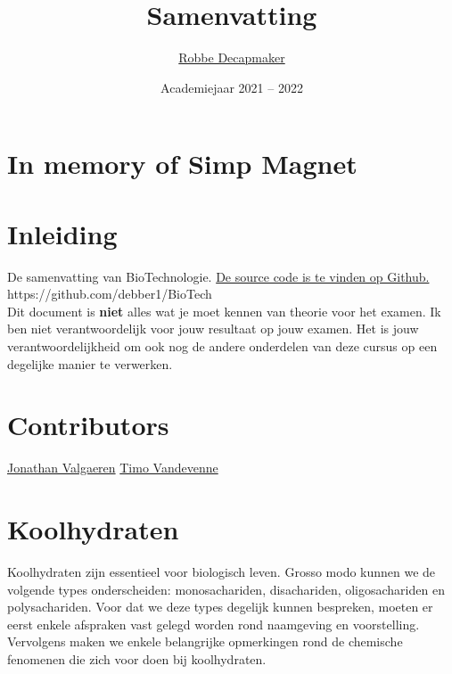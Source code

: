 \documentclass[a4paper,kul]{kulakarticle} %
\date{Academiejaar 2021 -- 2022}
\title{Samenvatting}
\author{\href{https://github.com/debber1}{Robbe Decapmaker}}
\begin{document}
\maketitle
\section*{In memory of Simp Magnet}
\section*{Inleiding}

De samenvatting van BioTechnologie. \href{https://github.com/debber1/BioTech}{De source code is te vinden op Github.}\\
https://github.com/debber1/BioTech\\
\newline
Dit document is \textbf{niet} alles wat je moet kennen van theorie voor het examen. Ik ben niet verantwoordelijk voor jouw resultaat op jouw examen. Het is jouw verantwoordelijkheid om ook nog de andere onderdelen van deze cursus op een degelijke manier te verwerken.
\section*{Contributors}
\href{https://github.com/ItsAlphie}{Jonathan Valgaeren}
\newline
\href{https://github.com/TimoNotThy}{Timo Vandevenne}
\newpage
\tableofcontents
\newpage
\section{Koolhydraten}
Koolhydraten zijn essentieel voor biologisch leven. Grosso modo kunnen we de volgende types onderscheiden: monosachariden, disachariden, oligosachariden en polysachariden. Voor dat we deze types degelijk kunnen bespreken, moeten er eerst enkele afspraken vast gelegd worden rond naamgeving en voorstelling. Vervolgens maken we enkele belangrijke opmerkingen rond de chemische fenomenen die zich voor doen bij koolhydraten. 
\end{document}
